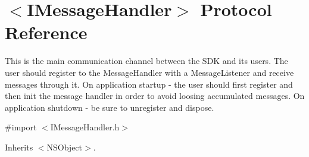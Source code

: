 \hypertarget{protocol_i_message_handler-p}{}\section{$<$I\+Message\+Handler$>$ Protocol Reference}
\label{protocol_i_message_handler-p}


This is the main communication channel between the S\+D\+K and its users. The user should register to the Message\+Handler with a Message\+Listener and receive messages through it. On application startup -\/ the user should first register and then init the message handler in order to avoid loosing accumulated messages. On application shutdown -\/ be sure to unregister and dispose.  




{\ttfamily \#import $<$I\+Message\+Handler.\+h$>$}



Inherits $<$\+N\+S\+Object$>$.


